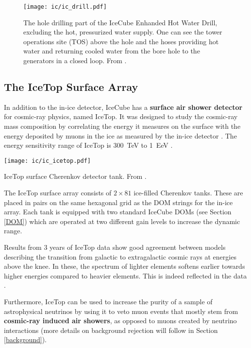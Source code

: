 \begin{figure}[]
    \texttt{[image: ic/ic\_drill.pdf]}
    \caption[IceCube enhanced hot water drill]{The hole drilling part of the IceCube Enhanded Hot Water Drill, excluding the hot, pressurized water supply. One can see the tower operations site (TOS) above the hole and the hoses providing hot water and returning cooled water from the bore hole to the generators in a closed loop. From \cite{Benson2014}.}
\end{figure}

\subsection{The IceTop Surface Array}
In addition to the in-ice detector, IceCube has a \textbf{surface air shower detector} for cosmic-ray physics, named IceTop. It was designed to study the cosmic-ray mass composition by correlating the energy it measures on the surface with the energy deposited by muons in the ice as measured by the in-ice detector . The energy sensitivity range of IceTop is \SI{300}{\tera\eV} to \SI{1}{\exa\eV} .

\begin{marginfigure}
    \texttt{[image: ic/ic\_icetop.pdf]}
    \caption[IceTop detector]{IceTop surface Cherenkov detector tank. From \cite{Abbasi2013}.}
\end{marginfigure}

The IceTop surface array consists of $2\times81$ ice-filled Cherenkov tanks. These are placed in pairs on the same hexagonal grid as the DOM strings for the in-ice array. Each tank is equipped with two standard IceCube DOMs (see Section \ref{DOM}) \cite{Abbasi2013} which are operated at two different gain levels to increase the dynamic range.

Results from 3 years of IceTop data show good agreement between models describing the transition from galactic to extragalactic cosmic rays at energies above the knee. In these, the spectrum of lighter elements softens earlier towards higher energies compared to heavier elements. This is indeed reflected in the data .

Furthermore, IceTop can be used to increase the purity of a sample of astrophysical neutrinos by using it to veto muon events that mostly stem from \textbf{cosmic-ray induced air showers}, as opposed to muons created by neutrino interactions  (more details on background rejection will follow in Section \ref{background}).

